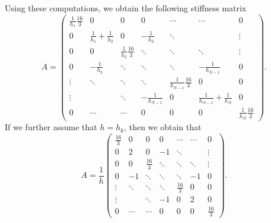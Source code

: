 \documentclass[english]{exercise}
\begin{document}
    Using these computations, we obtain the following stiffness matrix
    \[
        A = \begin{pmatrix}
            \frac{1}{h_1}\frac{16}{3} & 0 & 0 & 0 & \cdots & \cdots & 0\\
            0 & \frac{1}{h_1} + \frac{1}{h_2} & 0 & -\frac{1}{h_2} & \ddots & & \vdots\\
            0 & 0 & \frac{1}{h_2}\frac{16}{3} & \ddots & \ddots & \ddots & \vdots\\
            0 & -\frac{1}{h_2} & \ddots & \ddots & \ddots & -\frac{1}{h_{N - 1}} & 0\\
            \vdots & \ddots & \ddots & \ddots & \frac{1}{h_{N - 1}}\frac{16}{3} & 0 & 0\\
            \vdots & & \ddots & -\frac{1}{h_{N - 1}} & 0 & \frac{1}{h_{N - 1}} + \frac{1}{h_N} & 0\\
            0 & \cdots & \cdots & 0 & 0 & 0 & \frac{1}{h_N}\frac{16}{3}
        \end{pmatrix}.
    \]
    If we further assume that \(h = h_k\), then we obtain that
    \[
        A = \frac{1}{h}\begin{pmatrix}
            \frac{16}{3} & 0 & 0 & 0 & \cdots & \cdots & 0\\
            0 & 2 & 0 & -1 & \ddots & & \vdots\\
            0 & 0 & \frac{16}{3} & \ddots & \ddots & \ddots & \vdots\\
            0 & -1 & \ddots & \ddots & \ddots & -1 & 0\\
            \vdots & \ddots & \ddots & \ddots & \frac{16}{3} & 0 & 0\\
            \vdots & & \ddots & -1 & 0 & 2 & 0\\
            0 & \cdots & \cdots & 0 & 0 & 0 & \frac{16}{3}
        \end{pmatrix}.
    \]
\end{document}
